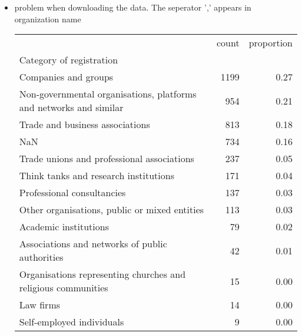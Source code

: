 \documentclass[ 11pt]{article}
\begin{document}
\newpage
\begin{itemize}
 \item problem when downloading the data. The seperator ',' appears in organization name
  


\begin{tabular}{lrr}
\toprule
 & count & proportion \\
Category of registration &  &  \\
\midrule
Companies and groups & 1199 & 0.27 \\
Non-governmental organisations, platforms and networks and similar & 954 & 0.21 \\
Trade and business associations & 813 & 0.18 \\
NaN & 734 & 0.16 \\
Trade unions and professional associations & 237 & 0.05 \\
Think tanks and research institutions & 171 & 0.04 \\
Professional consultancies & 137 & 0.03 \\
Other organisations, public or mixed entities & 113 & 0.03 \\
Academic institutions & 79 & 0.02 \\
Associations and networks of public authorities & 42 & 0.01 \\
Organisations representing churches and religious communities & 15 & 0.00 \\
Law firms & 14 & 0.00 \\
Self-employed individuals & 9 & 0.00 \\
\bottomrule
\end{tabular}


\end{itemize}
\end{document}
